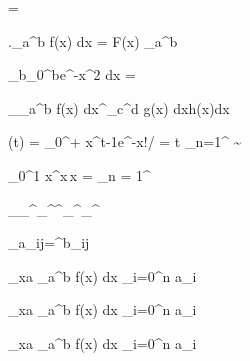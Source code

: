
\sigma = 

\left.\int_a^b f(x) dx =  F(x) \right\mid_a^b

\lim_{b\to\infty}\int_0^{b}e^{-x^2} dx = 

\int_{\int_a^b f(x) dx}^{\int_c^d g(x) dx}h(x)dx

\Gamma(t) = \int_0^{+\infty} x^{t-1}e^{-x}!/ =  t \prod_{n=1}^{\infty} \sim{}

\int_0^1 x^x\,x = \sum_{n = 1}^

\prod_{{}_\phi^\chi{}_\omega^\psi}^{{}_\iota^\kappa{}_\mu^\lambda}

\sum_{}a_{ij}=\prod^{}b_{ij}

\lim_{x\to a} \quad \int_a^b f(x) dx \quad \sum_{i=0}^n a_i

\lim\limits_{x\to a} \quad \int\limits_a^b f(x) dx \quad \sum\limits_{i=0}^n a_i

\lim\nolimits_{x\to a} \quad \int\nolimits_a^b f(x) dx \quad \sum\nolimits_{i=0}^n a_i
